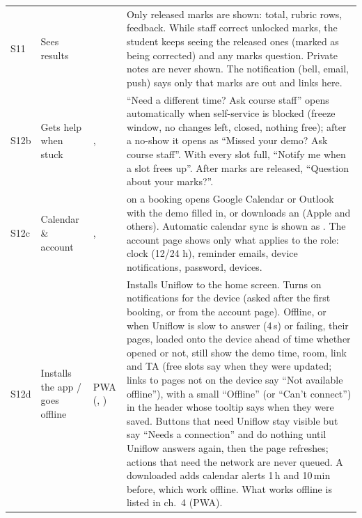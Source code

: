{\begin{xltabular}{\linewidth}{@{}l P{34mm} P{30mm} L@{}}
  S11 & Sees results &  & Only released marks are shown: total, rubric rows, feedback. While staff correct unlocked marks, the student keeps seeing the released ones (marked as being corrected) and any marks question. Private notes are never shown. The  notification (bell, email, push) says only that marks are out and links here.\\
  S12b & Gets help when stuck & ,  & ``Need a different time? Ask course staff'' opens automatically when self-service is blocked (freeze window, no changes left, closed, nothing free); after a no-show it opens as ``Missed your demo? Ask course staff''. With every slot full, ``Notify me when a slot frees up''. After marks are released, ``Question about your marks?''.\\
  S12c & Calendar \& account & ,  &  on a booking opens Google Calendar or Outlook with the demo filled in, or downloads an  (Apple and others). Automatic calendar sync is shown as . The account page shows only what applies to the role: clock (12/24 h), reminder emails, device notifications, password, devices.\\
  S12d & Installs the app / goes offline & PWA (, ) & Installs Uniflow to the home screen. Turns on notifications for the device (asked after the first booking, or from the account page). Offline, or when Uniflow is slow to answer (4\,s) or failing, their pages, loaded onto the device ahead of time whether opened or not, still show the demo time, room, link and TA (free slots say when they were updated; links to pages not on the device say ``Not available offline''), with a small ``Offline'' (or ``Can't connect'') in the header whose tooltip says when they were saved. Buttons that need Uniflow stay visible but say ``Needs a connection'' and do nothing until Uniflow answers again, then the page refreshes; actions that need the network are never queued. A downloaded  adds calendar alerts 1\,h and 10\,min before, which work offline. What works offline is listed in ch.~4 (PWA).\\

\end{xltabular}}
